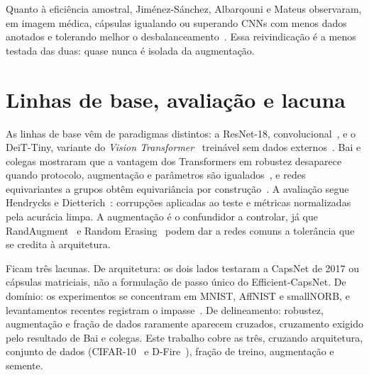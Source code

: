 Quanto à eficiência amostral, Jiménez-Sánchez, Albarqouni e Mateus observaram,
em imagem médica, cápsulas igualando ou superando CNNs com menos dados anotados
e tolerando melhor o desbalanceamento~\cite{jimenez2018capsules}. Essa
reivindicação é a menos testada das duas: quase nunca é isolada da augmentação.

\section{Linhas de base, avaliação e lacuna}
\label{sec:revisao:lacuna}

As linhas de base vêm de paradigmas distintos: a ResNet-18,
convolucional~\cite{he2016resnet}, e o DeiT-Tiny, variante do \emph{Vision
Transformer}~\cite{dosovitskiy2021vit} treinável sem dados
externos~\cite{touvron2021deit}. Bai e colegas mostraram que a vantagem dos
Transformers em robustez desaparece quando protocolo, augmentação e parâmetros
são igualados~\cite{bai2021transformers}, e redes equivariantes a grupos obtêm
equivariância por construção~\cite{cohen2016group}. A avaliação segue Hendrycks
e Dietterich~\cite{hendrycks2019benchmarking}: corrupções aplicadas ao teste e
métricas normalizadas pela acurácia limpa. A augmentação é o confundidor a
controlar, já que RandAugment~\cite{cubuk2020randaugment} e Random
Erasing~\cite{zhong2020randomerasing} podem dar a redes comuns a tolerância que
se credita à arquitetura.

Ficam três lacunas. De arquitetura: os dois lados testaram a CapsNet de 2017 ou
cápsulas matriciais, não a formulação de passo único do Efficient-CapsNet. De
domínio: os experimentos se concentram em MNIST, AffNIST e smallNORB, e
levantamentos recentes registram o impasse~\cite{haq2023survey}. De
delineamento: robustez, augmentação e fração de dados raramente aparecem
cruzados, cruzamento exigido pelo resultado de Bai e colegas. Este trabalho
cobre as três, cruzando arquitetura, conjunto de dados
(CIFAR-10~\cite{krizhevsky2009cifar} e D-Fire~\cite{venancio2022dfire}),
fração de treino, augmentação e semente.